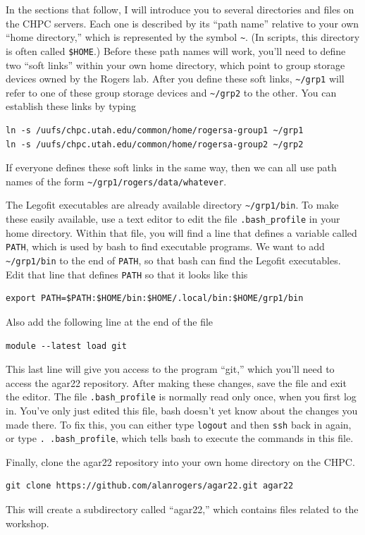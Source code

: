 \documentclass[11pt]{article}
\begin{document}
In the sections that follow, I will introduce you to several
directories and files on the CHPC servers. Each one is described by
its ``path name'' relative to your own ``home directory,'' which is
represented by the symbol \verb|~|. (In scripts, this directory is
often called \verb|$HOME|.) Before these path names will work, you'll
need to define two ``soft links'' within your own home directory,
which point to group storage devices owned by the Rogers lab. After
you define these soft links, \verb|~/grp1| will refer to one of these
group storage devices and \verb|~/grp2| to the other. You can
establish these links by typing
\begin{verbatim}
ln -s /uufs/chpc.utah.edu/common/home/rogersa-group1 ~/grp1
ln -s /uufs/chpc.utah.edu/common/home/rogersa-group2 ~/grp2
\end{verbatim}
If everyone defines these soft links in the same way, then we can all
use path names of the form \verb|~/grp1/rogers/data/whatever|.

The Legofit executables are already available directory
\verb|~/grp1/bin|. To make these easily available, use a text editor
to edit the file \verb|.bash_profile| in your home directory. Within
that file, you will find a line that defines a variable called
\texttt{PATH}, which is used by bash to find executable programs. We
want to add \verb|~/grp1/bin| to the end of \texttt{PATH}, so that
bash can find the Legofit executables. Edit that line that defines
\texttt{PATH} so that it looks like this
\begin{verbatim}
export PATH=$PATH:$HOME/bin:$HOME/.local/bin:$HOME/grp1/bin
\end{verbatim}
Also add the following line at the end of the file
\begin{verbatim}
module --latest load git
\end{verbatim}
This last line will give you access to the program ``git,'' which
you'll need to access the agar22 repository. After making these
changes, save the file and exit the editor. The file
\verb|.bash_profile| is normally read only once, when you first log
in. You've only just edited this file, bash doesn't yet know about the
changes you made there. To fix this, you can either type
\texttt{logout} and then \texttt{ssh} back in again, or type
\verb|. .bash_profile|, which tells bash to execute the commands in
this file.

Finally, clone the agar22 repository into your own home directory on
the CHPC.
\begin{verbatim}
git clone https://github.com/alanrogers/agar22.git agar22
\end{verbatim}
This will create a subdirectory called ``agar22,'' which contains
files related to the workshop.
\end{document}
